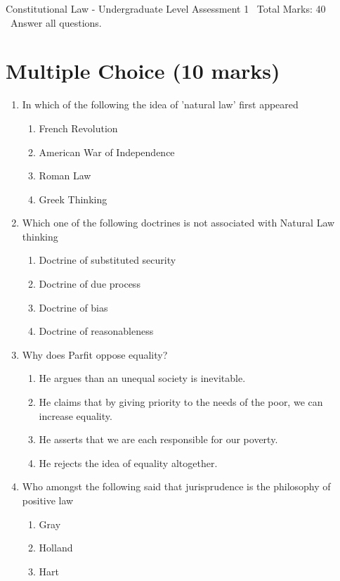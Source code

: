 \documentclass[12pt]{article}
\begin{document}
\begin{center}
Constitutional Law - Undergraduate Level Assessment 1 \
Total Marks: 40 \
Answer all questions.
\end{center}

\section*{Multiple Choice (10 marks)}
\begin{enumerate}[label=\arabic*.]
\item In which of the following the idea of 'natural law' first appeared
\begin{enumerate}[label=(\alph*)]
    \item French Revolution
    \item American War of Independence
    \item Roman Law
    \item Greek Thinking
\end{enumerate}
\item Which one of the following doctrines is not associated with Natural Law thinking
\begin{enumerate}[label=(\alph*)]
    \item Doctrine of substituted security
    \item Doctrine of due process
    \item Doctrine of bias
    \item Doctrine of reasonableness
\end{enumerate}
\item Why does Parfit oppose equality?
\begin{enumerate}[label=(\alph*)]
    \item He argues than an unequal society is inevitable.
    \item He claims that by giving priority to the needs of the poor, we can increase equality.
    \item He asserts that we are each responsible for our poverty.
    \item He rejects the idea of equality altogether.
\end{enumerate}
\item Who amongst the following said that jurisprudence is the philosophy of positive law
\begin{enumerate}[label=(\alph*)]
    \item Gray
    \item Holland
    \item Hart

\end{enumerate}
\end{enumerate}
\end{document}
